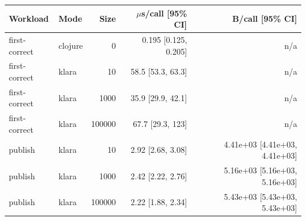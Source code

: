 \begin{tabular}{llrrr}
\toprule Workload & Mode & Size & $\mu$s/call [95\% CI] & B/call [95\% CI] \\
\midrule
first-correct & clojure & 0 & 0.195 [0.125, 0.205] & n/a \\
first-correct & klara & 10 & 58.5 [53.3, 63.3] & n/a \\
first-correct & klara & 1000 & 35.9 [29.9, 42.1] & n/a \\
first-correct & klara & 100000 & 67.7 [29.3, 123] & n/a \\
publish & klara & 10 & 2.92 [2.68, 3.08] & 4.41e+03 [4.41e+03, 4.41e+03] \\
publish & klara & 1000 & 2.42 [2.22, 2.76] & 5.16e+03 [5.16e+03, 5.16e+03] \\
publish & klara & 100000 & 2.22 [1.88, 2.34] & 5.43e+03 [5.43e+03, 5.43e+03] \\
\bottomrule
\end{tabular}
